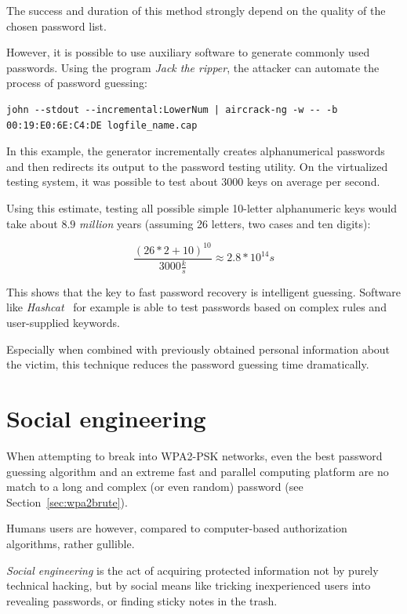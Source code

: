 The success and duration of this method strongly depend on the quality of the chosen password list.

However, it is possible to use auxiliary software to generate commonly used passwords. Using the program \emph{Jack the ripper}, the attacker can automate the process of password guessing:

\begin{lstlisting}
john --stdout --incremental:LowerNum | aircrack-ng -w -- -b 00:19:E0:6E:C4:DE logfile_name.cap
\end{lstlisting}

In this example, the generator incrementally creates alphanumerical passwords and then redirects its output to the password testing utility. On the virtualized testing system, it was possible to test about 3000 keys on average per second.

Using this estimate, testing all possible simple 10-letter alphanumeric keys would take about \(8.9\) \emph{million} years (assuming 26 letters, two cases and ten digits):

\begin{displaymath}
\frac{{(26 * 2 + 10)}^{10}}{3000\frac{k}{s}}\approx2.8*10^{14} s
\end{displaymath}

This shows that the key to fast password recovery is intelligent guessing. Software like \emph{Hashcat}~\cite{Steube17} for example is able to test passwords based on complex rules and user-supplied keywords.

Especially when combined with previously obtained personal information about the victim, this technique reduces the password guessing time dramatically.

\section{Social engineering}\label{sec:attackuser}

When attempting to break into WPA2-PSK networks, even the best password guessing algorithm and an extreme fast and parallel computing platform are no match to a long and complex (or even random) password (see Section~\ref{sec:wpa2brute}).

Humans users are however, compared to computer-based authorization algorithms, rather gullible. 

\emph{Social engineering} is the act of acquiring protected information not by purely technical hacking, but by social means like tricking inexperienced users into revealing passwords, or finding sticky notes in the trash.

